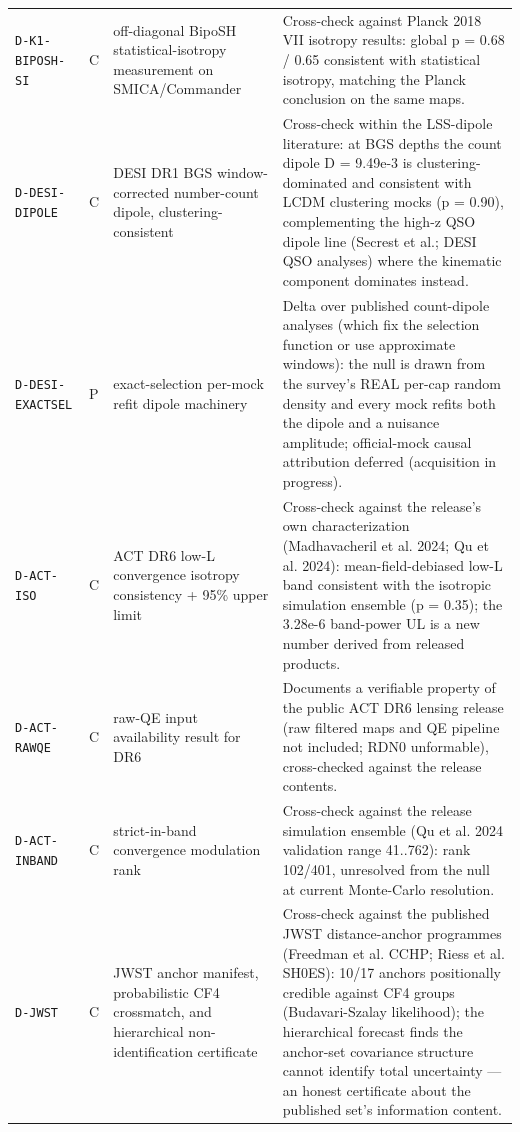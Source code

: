 \documentclass[10pt]{article}
\theoremstyle{definition}
\newcommand{\code}[1]{\texttt{\small #1}}
\begin{document}
\begin{center}
\begin{longtable}{p{2.0cm} p{0.7cm} p{5.4cm} p{6.5cm}}
\code{D-K1-BIPOSH-SI} & C & off-diagonal BipoSH statistical-isotropy measurement on SMICA/Commander & Cross-check against Planck 2018 VII isotropy results: global p = 0.68 / 0.65 consistent with statistical isotropy, matching the Planck conclusion on the same maps. \\[2pt]
\code{D-DESI-DIPOLE} & C & DESI DR1 BGS window-corrected number-count dipole, clustering-consistent & Cross-check within the LSS-dipole literature: at BGS depths the count dipole D = 9.49e-3 is clustering-dominated and consistent with LCDM clustering mocks (p = 0.90), complementing the high-z QSO dipole line (Secrest et al.; DESI QSO analyses) where the kinematic component dominates instead. \\[2pt]
\code{D-DESI-EXACTSEL} & P & exact-selection per-mock refit dipole machinery & Delta over published count-dipole analyses (which fix the selection function or use approximate windows): the null is drawn from the survey's REAL per-cap random density and every mock refits both the dipole and a nuisance amplitude; official-mock causal attribution deferred (acquisition in progress). \\[2pt]
\code{D-ACT-ISO} & C & ACT DR6 low-L convergence isotropy consistency + 95\% upper limit & Cross-check against the release's own characterization (Madhavacheril et al. 2024; Qu et al. 2024): mean-field-debiased low-L band consistent with the isotropic simulation ensemble (p = 0.35); the 3.28e-6 band-power UL is a new number derived from released products. \\[2pt]
\code{D-ACT-RAWQE} & C & raw-QE input availability result for DR6 & Documents a verifiable property of the public ACT DR6 lensing release (raw filtered maps and QE pipeline not included; RDN0 unformable), cross-checked against the release contents. \\[2pt]
\code{D-ACT-INBAND} & C & strict-in-band convergence modulation rank & Cross-check against the release simulation ensemble (Qu et al. 2024 validation range 41..762): rank 102/401, unresolved from the null at current Monte-Carlo resolution. \\[2pt]
\code{D-JWST} & C & JWST anchor manifest, probabilistic CF4 crossmatch, and hierarchical non-identification certificate & Cross-check against the published JWST distance-anchor programmes (Freedman et al. CCHP; Riess et al. SH0ES): 10/17 anchors positionally credible against CF4 groups (Budavari-Szalay likelihood); the hierarchical forecast finds the anchor-set covariance structure cannot identify total uncertainty — an honest certificate about the published set's information content. \\[2pt]

\end{longtable}
\end{center}
\end{document}
